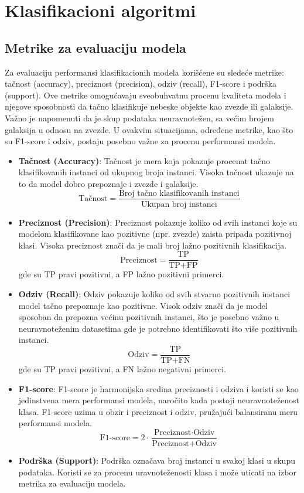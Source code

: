 \documentclass[a4paper,12pt]{article}
\begin{document}
\section{Klasifikacioni algoritmi}

\subsection{Metrike za evaluaciju modela}
Za evaluaciju performansi klasifikacionih modela korišćene su sledeće metrike: tačnost (accuracy), preciznost (precision), odziv (recall), F1-score i podrška (support). Ove metrike omogućavaju sveobuhvatnu procenu kvaliteta modela i njegove sposobnosti da tačno klasifikuje nebeske objekte kao zvezde ili galaksije.\\
Važno je napomenuti da je skup podataka neuravnotežen, sa većim brojem galaksija u odnosu na zvezde. U ovakvim situacijama, određene metrike, kao što su F1-score i odziv, postaju posebno važne za procenu performansi modela.

\begin{itemize}
    \item \textbf{Tačnost (Accuracy)}: Tačnost je mera koja pokazuje procenat tačno klasifikovanih instanci od ukupnog broja instanci. Visoka tačnost ukazuje na to da model dobro prepoznaje i zvezde i galaksije.
    \[
    \text{Tačnost} = \frac{\text{Broj tačno klasifikovanih instanci}}{\text{Ukupan broj instanci}}
    \]
    
    \item \textbf{Preciznost (Precision)}: Preciznost pokazuje koliko od svih instanci koje su modelom klasifikovane kao pozitivne (npr. zvezde) zaista pripada pozitivnoj klasi. Visoka preciznost znači da je mali broj lažno pozitivnih klasifikacija.
    \[
    \text{Preciznost} = \frac{\text{TP}}{\text{TP} + \text{FP}}
    \]
    gde su TP pravi pozitivni, a FP lažno pozitivni primerci.

    \item \textbf{Odziv (Recall)}: Odziv pokazuje koliko od svih stvarno pozitivnih instanci model tačno prepoznaje kao pozitivne. Visok odziv znači da je model sposoban da prepozna većinu pozitivnih instanci, što je posebno važno u neuravnoteženim datasetima gde je potrebno identifikovati što više pozitivnih instanci.
    \[
    \text{Odziv} = \frac{\text{TP}}{\text{TP} + \text{FN}}
    \]
    gde su TP pravi pozitivni, a FN lažno negativni primerci.

    \item \textbf{F1-score}: F1-score je harmonijska sredina preciznosti i odziva i koristi se kao jedinstvena mera performansi modela, naročito kada postoji neuravnoteženost klasa. F1-score uzima u obzir i preciznost i odziv, pružajući balansiranu meru performansi modela.
    \[
    \text{F1-score} = 2 \cdot \frac{\text{Preciznost} \cdot \text{Odziv}}{\text{Preciznost} + \text{Odziv}}
    \]

    \item \textbf{Podrška (Support)}: Podrška označava broj instanci u svakoj klasi u skupu podataka. Koristi se za procenu uravnoteženosti klasa i može uticati na izbor metrika za evaluaciju modela.
\end{itemize}
\end{document}
